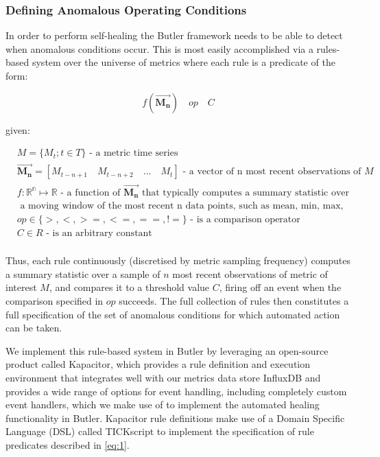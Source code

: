 \subsubsection{Defining Anomalous Operating Conditions}

In order to perform self-healing the Butler framework needs to be able to detect when anomalous conditions occur. This is most easily accomplished via a rules-based system over the universe of metrics where each rule is a predicate of the form:

\begin{equation}\label{eq:1}
    f(\vec{\mathbf{M_n}})\quad op \quad C
\end{equation}

given: 

\begin{align*}
  &M = \{M_t; t \in T\}\text{ - a metric time series}\\
&\vec{\mathbf{M_n}} = [M_{t-n+1} \quad M_{t-n+2} \quad ... \quad M_t]\text{ - a vector of n most recent observations of }M\\
&f\colon \mathbb{R^{n}} \mapsto \mathbb{R}\text{ - a function of }\vec{\mathbf{M_n}}\text{ that typically computes a summary statistic over}\\
&\text{ a moving window of the most recent n data points, such as mean, min, max, etc.}\\
&op \in \{>,<, >=, <=, ==, !=\}\text{ - is a comparison operator}\\
&C \in R\text{ - is an arbitrary constant}\\
\end{align*}


Thus, each rule continuously (discretised by metric sampling frequency) computes a summary statistic over a sample of $n$ most recent observations of metric of interest $M$, and compares it to a threshold value $C$, firing off an event when the comparison specified in $op$ succeeds. The full collection of rules then constitutes a full specification of the set of anomalous conditions for which automated action can be taken.

We implement this rule-based system in Butler by leveraging an open-source product called Kapacitor\autocite{kapacitor}, which provides a rule definition and execution environment that integrates well with our metrics data store InfluxDB and provides a wide range of options for event handling, including completely custom event handlers, which we make use of to implement the automated healing functionality in Butler. Kapacitor rule definitions make use of a Domain Specific Language (DSL) called TICKscript to implement the specification of rule predicates described in \ref{eq:1}.

